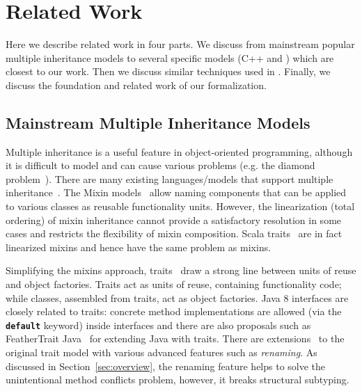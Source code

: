 \section{Related Work}
Here we describe related work in four parts. We discuss from mainstream popular multiple 
inheritance models to several specific models (C++ and \csharp) which are closest to our work. Then we 
discuss similar techniques used in \self. Finally, we discuss the foundation and related work of our formalization.

\subsection{Mainstream Multiple Inheritance Models}
Multiple inheritance is a useful feature in object-oriented
programming, although it is difficult to model and can 
cause various problems (e.g. the diamond problem~\cite{Sak89dis,Singh1995}).  
There are many existing languages/models that support multiple 
inheritance~\cite{ellis1990annotated,scala-overview,bracha90mixin,scharli03traits,malayeri2009cz,csharpdoc,Moon1986,Flatt1998,Ancona2003}. 
The Mixin models~\cite{bracha90mixin,Flatt1998,van1996encapsulation,Ancona2003,Hendler86} allow naming components 
that can be applied to various classes as reusable functionality units. However, the linearization (total ordering) of mixin 
inheritance cannot provide a satisfactory resolution in some cases and restricts the flexibility of mixin composition. 
Scala traits~\cite{scala-overview} are in fact linearized mixins and hence have the same problem as mixins.

Simplifying the mixins approach, traits~\cite{scharli03traits,Ducasse:2006:TMF:1119479.1119483} draw a
strong line between units of reuse and object factories. Traits act
as units of reuse, containing functionality code; while classes,
assembled from traits, act as object factories. Java 8
interfaces are closely related to traits: concrete method
implementations are allowed (via the \textbf{\texttt{default}}
keyword) inside interfaces and there are also proposals such as FeatherTrait Java~\cite{Liquori08ftj} 
for extending Java with traits. There are extensions~\cite{reppy2006foundation,Reppy:2007:MT:2394758.2394784} to 
the original trait model with various advanced features such as \emph{renaming}. As discussed in Section~\ref{sec:overview},
the renaming feature helps to solve the unintentional method conflicts problem, however, it breaks structural subtyping.

\begin{comment}
There are also proposals for extending Java with traits. For example, 
FeatherTrait Java (FTJ) [14] extends FJ [13] with statically-typed traits, 
adding trait-based inheritance in Java. Except for few, mostly syntac- tic details, 
their work can be emulated with Java 8 interfaces. There are also extensions 
to the original trait model, with operations (e.g. renaming [18], which breaks 
structural sub- typing) that default methods and interfaces cannot model.
\end{comment}

